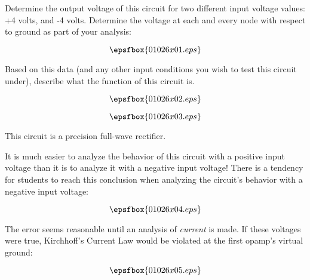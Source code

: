 

Determine the output voltage of this circuit for two different input voltage values: +4 volts, and -4 volts.  Determine the voltage at each and every node with respect to ground as part of your analysis:

$$\epsfbox{01026x01.eps}$$

Based on this data (and any other input conditions you wish to test this circuit under), describe what the function of this circuit is.







$$\epsfbox{01026x02.eps}$$

$$\epsfbox{01026x03.eps}$$

\vskip 10pt

This circuit is a precision full-wave rectifier.







It is much easier to analyze the behavior of this circuit with a positive input voltage than it is to analyze it with a negative input voltage!  There is a tendency for students to reach this conclusion when analyzing the circuit's behavior with a negative input voltage:

$$\epsfbox{01026x04.eps}$$

The error seems reasonable until an analysis of {\it current} is made.  If these voltages were true, Kirchhoff's Current Law would be violated at the first opamp's virtual ground:

$$\epsfbox{01026x05.eps}$$




